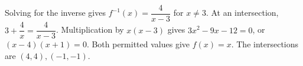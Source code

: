 Solving for the inverse gives $f^{-1}(x)=\dfrac{4}{x-3}$ for $x\ne3$. At an intersection, $3+\dfrac{4}{x}=\dfrac{4}{x-3}$. Multiplication by $x(x-3)$ gives $3x^2-9x-12=0$, or $(x-4)(x+1)=0$. Both permitted values give $f(x)=x$. The intersections are $\boxed{(4,4),(-1,-1)}$.
